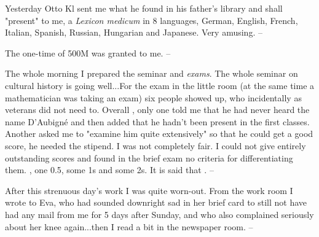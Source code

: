 
Yesterday Otto Kl sent me what he found in his father's library and shall "present" to me, a \textit{Lexicon medicum} in 8 languages, German, English, French, Italian, Spanish, Russian, Hungarian and Japanese. Very amusing. --

The one-time  of 500M was granted to me. --

\missing

The whole morning I prepared the seminar and \textit{exams}. The whole seminar on cultural history is going well...For the exam in the little room (at the same time a mathematician was taking an exam) six people showed up, who incidentally as veterans did not need to. Overall , only one told me that he had never heard the name D'Aubigné and then added that he hadn't been present in the first classes. Another asked me to "examine him quite extensively" so that he could get a good score, he needed the stipend. I was not completely fair. I could not give entirely outstanding scores and found in the brief exam no criteria for differentiating them. , one 0.5, some 1s and some 2s. It is said that . --

After this strenuous day's work I was quite worn-out. From the work room I wrote to Eva, who had sounded downright sad in her brief card to still not have had any mail from me for 5 days after Sunday, and who also complained seriously about her knee again...then I read a bit in the newspaper room. --

